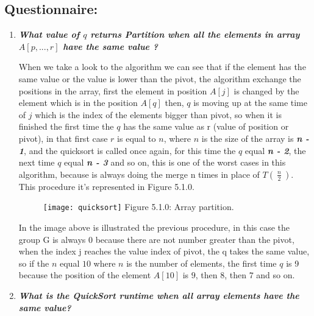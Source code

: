 \subsection{Questionnaire:}

\begin{enumerate}
\item {\bfseries\itshape What value of $q$ returns {\bfseries\itshape Partition} when all the elements in array $A [p, ..., r]$ have the same value ?}\hfill 

When we take a look to the algorithm we can see that if the element has the same value or the value is lower than the pivot, the algorithm exchange the positions in the array, first the element in position $A[j]$ is changed by the element which is in the position $A[q]$ then,  $q$ is moving up at the same time of $j$ which is the index of the elements bigger than pivot, so when it is finished the first time the $q$ has the same value as r (value of position or pivot), in that first case $r$ is equal to $n$, where $n$ is the size of the array is  {\bfseries\itshape n - 1}, and the quicksort is called once again, for this time the $q$ equal {\bfseries\itshape n - 2}, the next time $q$ equal {\bfseries\itshape n - 3} and so on, this is one of the worst cases in this algorithm, because is always doing the merge n times in place of $T(\ \frac{n}{2}\ )$. This procedure it's represented in Figure 5.1.0.

\begin{figure}[H]
\texttt{[image: quicksort]}
\centering \linebreak \linebreak Figure 5.1.0: Array partition. 
\end{figure}

In the image above is illustrated the previous procedure, in this case the group G is always 0 because there are not number greater than the pivot, when the index j reaches the value index of pivot, the q takes the same value, so if the $n$ equal $10$ where $n$ is the number of elements, the first time $q$ is 9 because the position of the element $A[10]$ is $9$, then $8$, then $7$ and so on. \hfill \break

 {\bfseries\itshape\color{armygreen}{Observation:}} {\itshape\color{armygreen}{This is the worst case in the algorithm, the analytic demonstration is covered in section 5.2.}} \hfill \break


\pagebreak

\item {\bfseries\itshape What is the QuickSort runtime when all array elements have the same value?} \hfill \break


\end{enumerate}
